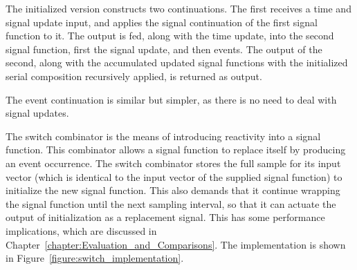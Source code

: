 The initialized version constructs two continuations. The first receives a time
and signal update input, and applies the signal continuation of the first
signal function to it. The output is fed, along with the time update, into the
second signal function, first the signal update, and then events. The output
of the second, along with the accumulated updated signal functions with the
initialized serial composition recursively applied, is returned as output.

The event continuation is similar but simpler, as there is no need to deal
with signal updates.

The switch combinator is the means of introducing reactivity into a signal
function. This combinator allows a signal function to replace itself by
producing an event occurrence. The switch combinator stores the full sample
for its input vector (which is identical to the input vector of the supplied
signal function) to initialize the new signal function. This also demands that
it continue wrapping the signal function until the next sampling interval, so
that it can actuate the output of initialization as a replacement signal. This
has some performance implications, which are discussed in
Chapter~\ref{chapter:Evaluation_and_Comparisons}. The implementation is shown in
Figure~\ref{figure:switch_implementation}.

